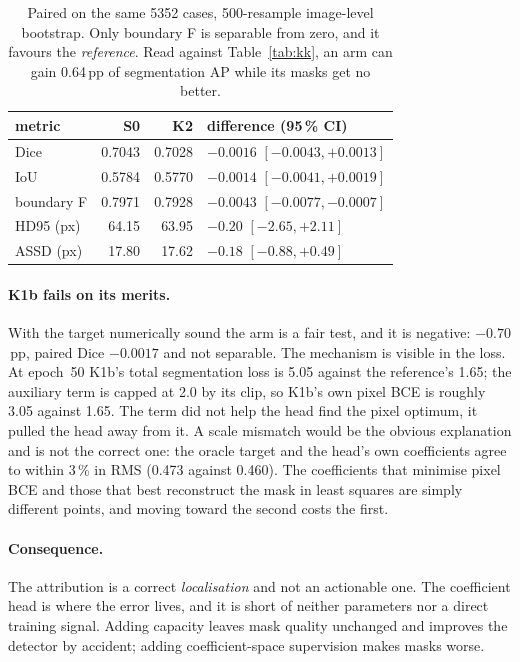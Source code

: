 \documentclass[11pt,letterpaper]{article}
\begin{document}
\begin{table}[h]
\centering\small
\begin{tabular}{lrrl}
\toprule
metric & S0 & K2 & difference (95\,\% CI) \\
\midrule
Dice & 0.7043 & 0.7028 & $-0.0016$ $[-0.0043,+0.0013]$ \\
IoU & 0.5784 & 0.5770 & $-0.0014$ $[-0.0041,+0.0019]$ \\
boundary F & 0.7971 & 0.7928 & $\mathbf{-0.0043}$ $[-0.0077,-0.0007]$ \\
HD95 (px) & 64.15 & 63.95 & $-0.20$ $[-2.65,+2.11]$ \\
ASSD (px) & 17.80 & 17.62 & $-0.18$ $[-0.88,+0.49]$ \\
\bottomrule
\end{tabular}
\caption{Paired on the same 5352 cases, 500-resample image-level bootstrap.
Only boundary F is separable from zero, and it favours the \emph{reference}.
Read against Table~\ref{tab:kk}, an arm can gain 0.64\,pp of segmentation AP
while its masks get no better.}
\label{tab:kkpaired}
\end{table}

\paragraph{K1b fails on its merits.} With the target numerically sound the arm
is a fair test, and it is negative: $-0.70$\,pp, paired Dice $-0.0017$ and not
separable. The mechanism is visible in the loss. At epoch~50 K1b's total
segmentation loss is 5.05 against the reference's 1.65; the auxiliary term is
capped at 2.0 by its clip, so K1b's own pixel BCE is roughly 3.05 against 1.65.
The term did not help the head find the pixel optimum, it pulled the head away
from it. A scale mismatch would be the obvious explanation and is not the
correct one: the oracle target and the head's own coefficients agree to within
3\,\% in RMS (0.473 against 0.460). The coefficients that minimise pixel BCE and
those that best reconstruct the mask in least squares are simply different
points, and moving toward the second costs the first.

\paragraph{Consequence.} The attribution is a correct \emph{localisation} and
not an actionable one. The coefficient head is where the error lives, and it is
short of neither parameters nor a direct training signal. Adding capacity leaves
mask quality unchanged and improves the detector by accident; adding
coefficient-space supervision makes masks worse.
\end{document}
